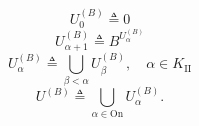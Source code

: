 $$U_0^{(B)} \triangleq 0$$
$$U_{\alpha+1}^{(B)} \triangleq B^{U_{\alpha}^{(B)}}$$
$$U_{\alpha}^{(B)} \triangleq \bigcup_{\beta < \alpha} U_{\beta}^{(B)}, \quad \alpha \in K_{\mathrm{II}}$$
$$U^{(B)} \triangleq \bigcup_{\alpha \in \mathrm{On}} U_{\alpha}^{(B)}.$$
